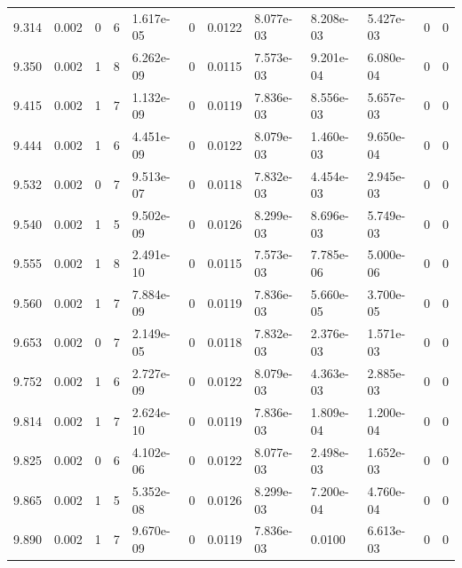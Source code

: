 \documentclass[preview]{standalone}
\begin{document}
{{{{{{\begin{tabular}{L{1.2cm}C{1.2cm} C{0.3cm}C{0.5cm} C{1.4cm}C{1.4cm} C{1.4cm}C{1.4cm} C{1.6cm}C{1.6cm} C{1.6cm}C{1.6cm}}
  9.314  &  0.002  & 0     &  6 &  1.617e-05  & 0  &  0.0122&   8.077e-03& 8.208e-03 & 5.427e-03   &  0 & 0  \\ 
  9.350  &  0.002  & 1     &  8 &  6.262e-09  & 0  &  0.0115&   7.573e-03& 9.201e-04 & 6.080e-04   &  0 & 0  \\ 
  9.415  &  0.002  & 1     &  7 &  1.132e-09  & 0  &  0.0119&   7.836e-03& 8.556e-03 & 5.657e-03   &  0 & 0  \\ 
  9.444  &  0.002  & 1     &  6 &  4.451e-09  & 0  &  0.0122&   8.079e-03& 1.460e-03 & 9.650e-04   &  0 & 0  \\ 
  9.532  &  0.002  & 0     &  7 &  9.513e-07  & 0  &  0.0118&   7.832e-03& 4.454e-03 & 2.945e-03   &  0 & 0  \\ 
  9.540  &  0.002  & 1     &  5 &  9.502e-09  & 0  &  0.0126&   8.299e-03& 8.696e-03 & 5.749e-03   &  0 & 0  \\ 
  9.555  &  0.002  & 1     &  8 &  2.491e-10  & 0  &  0.0115&   7.573e-03& 7.785e-06 & 5.000e-06   &  0 & 0  \\ 
  9.560  &  0.002  & 1     &  7 &  7.884e-09  & 0  &  0.0119&   7.836e-03& 5.660e-05 & 3.700e-05   &  0 & 0  \\ 
  9.653  &  0.002  & 0     &  7 &  2.149e-05  & 0  &  0.0118&   7.832e-03& 2.376e-03 & 1.571e-03   &  0 & 0  \\ 
  9.752  &  0.002  & 1     &  6 &  2.727e-09  & 0  &  0.0122&   8.079e-03& 4.363e-03 & 2.885e-03   &  0 & 0  \\ 
  9.814  &  0.002  & 1     &  7 &  2.624e-10  & 0  &  0.0119&   7.836e-03& 1.809e-04 & 1.200e-04   &  0 & 0  \\ 
  9.825  &  0.002  & 0     &  6 &  4.102e-06  & 0  &  0.0122&   8.077e-03& 2.498e-03 & 1.652e-03   &  0 & 0  \\ 
  9.865  &  0.002  & 1     &  5 &  5.352e-08  & 0  &  0.0126&   8.299e-03& 7.200e-04 & 4.760e-04   &  0 & 0  \\ 
  9.890  &  0.002  & 1     &  7 &  9.670e-09  & 0  &  0.0119&   7.836e-03& 0.0100 & 6.613e-03   &  0 & 0  \\ 
\hline 
\end{tabular} 

}}}}}}
\end{document}
